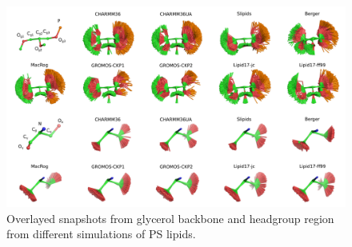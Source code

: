 \documentclass[aps,prl,superscriptaddress,twocolumn]{revtex4}
\begin{document}
\begin{figure}[]
  \centering
  \includegraphics[width=18.0cm]{../Figs/figS8.png}
  \caption{\label{HGstructuresPS}
    Overlayed snapshots from glycerol backbone and headgroup region from 
    different simulations of PS lipids.
  }
\end{figure}
\end{document}
